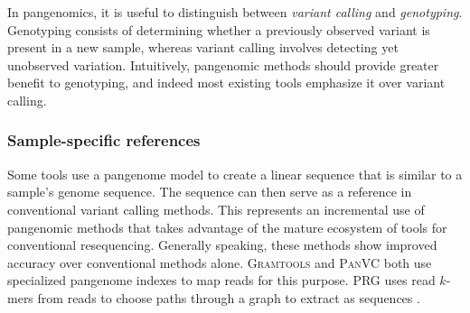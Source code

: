In pangenomics, it is useful to distinguish between \emph{variant calling} and \emph{genotyping}.
Genotyping consists of determining whether a previously observed variant is present in a new sample, whereas variant calling involves detecting yet unobserved variation.
Intuitively, pangenomic methods should provide greater benefit to genotyping, and indeed most existing tools emphasize it over variant calling.



\subsubsection{Sample-specific references}

Some tools use a pangenome model to create a linear sequence that is similar to a sample's genome sequence. 
The sequence can then serve as a reference in conventional variant calling methods.
This represents an incremental use of pangenomic methods that takes advantage of the mature ecosystem of tools for conventional resequencing.
Generally speaking, these methods show improved accuracy over conventional methods alone.
\textsc{Gramtools} \cite{Maciuca_2016} and \textsc{PanVC} \cite{Valenzuela_2018} both use specialized pangenome indexes to map reads for this purpose.
\textsc{PRG} uses read $k$-mers from reads to choose paths through a graph to extract as sequences \cite{dilthey2015improved}.

